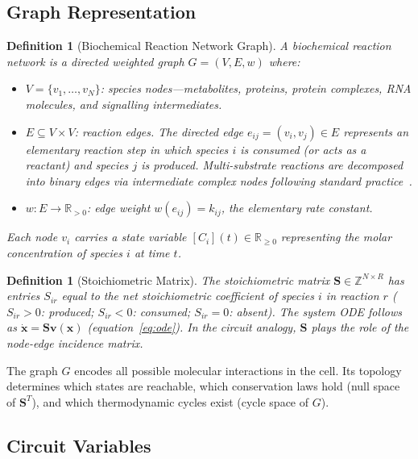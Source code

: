 \documentclass[twocolumn,10pt,a4paper]{article}
\newtheorem{definition}[theorem]{Definition}
\begin{document}
\subsection{Graph Representation}
\label{sec:circuit-graph}

\begin{definition}[Biochemical Reaction Network Graph]
\label{def:graph}
A \emph{biochemical reaction network} is a directed weighted graph
$G=(V,E,w)$ where:
\begin{itemize}[noitemsep]
  \item $V=\{v_1,\ldots,v_N\}$: species nodes---metabolites, proteins, protein
        complexes, RNA molecules, and signalling intermediates.
  \item $E\subseteq V\times V$: reaction edges.  The directed edge
        $e_{ij}=(v_i,v_j)\in E$ represents an elementary reaction step in
        which species $i$ is consumed (or acts as a reactant) and species $j$
        is produced.  Multi-substrate reactions are decomposed into binary
        edges via intermediate complex nodes following standard
        practice~\cite{HeinrichSchuster1996,Klipp2005}.
  \item $w:E\to\mathbb{R}_{>0}$: edge weight $w(e_{ij})=k_{ij}$, the
        elementary rate constant.
\end{itemize}
Each node $v_i$ carries a state variable $[C_i](t)\in\mathbb{R}_{\geq 0}$
representing the molar concentration of species $i$ at time $t$.
\end{definition}

\begin{definition}[Stoichiometric Matrix]
\label{def:stoich}
The \emph{stoichiometric matrix} $\mathbf{S}\in\mathbb{Z}^{N\times R}$ has
entries $S_{ir}$ equal to the net stoichiometric coefficient of species $i$ in
reaction $r$ ($S_{ir}>0$: produced; $S_{ir}<0$: consumed; $S_{ir}=0$:
absent).  The system ODE follows as $\dot{\mathbf{x}}=\mathbf{S}\mathbf{v}(\mathbf{x})$
(equation~\ref{eq:ode}).  In the circuit analogy, $\mathbf{S}$ plays the role
of the node-edge incidence matrix.
\end{definition}

The graph $G$ encodes all possible molecular interactions in the cell.  Its
topology determines which states are reachable, which conservation laws hold
(null space of $\mathbf{S}^T$), and which thermodynamic cycles exist (cycle
space of $G$).

\subsection{Circuit Variables}
\label{sec:circuit-vars}
\end{document}
